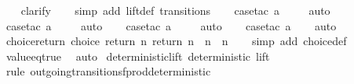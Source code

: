 \begin{isabellebody}
\ \ \isamarkupfalse%
\ clarify\isanewline
\ \ \isamarkupfalse%
\ {\isacharparenleft}simp\ add{\isacharcolon}\ lift{\isacharunderscore}def\ transitions{\isacharparenright}\isanewline
\ \ \isamarkupfalse%
\ {\isacharparenleft}case{\isacharunderscore}tac\ {\isachardoublequoteopen}a{\isacharequal}{}{\isachardoublequoteclose}{\isacharparenright}\isanewline
\ \ \ \isamarkupfalse%
\ auto{\isacharbrackleft}{}{\isacharbrackright}\isanewline
\ \ \isamarkupfalse%
\ {\isacharparenleft}case{\isacharunderscore}tac\ {\isachardoublequoteopen}a{\isacharequal}{}{\isachardoublequoteclose}{\isacharparenright}\isanewline
\ \ \ \isamarkupfalse%
\ auto{\isacharbrackleft}{}{\isacharbrackright}\isanewline
\ \ \isamarkupfalse%
\ {\isacharparenleft}case{\isacharunderscore}tac\ {\isachardoublequoteopen}a{\isacharequal}{}{\isachardoublequoteclose}{\isacharparenright}\isanewline
\ \ \ \isamarkupfalse%
\ auto{\isacharbrackleft}{}{\isacharbrackright}\isanewline
\ \ \isamarkupfalse%
\ {\isacharparenleft}case{\isacharunderscore}tac\ {\isachardoublequoteopen}a{\isacharequal}{}{\isachardoublequoteclose}{\isacharparenright}\isanewline
\ \ \isamarkupfalse%
\ auto%
\endisatagproof
{\isafoldproof}%
%
\isadelimproof
\isanewline
%
\endisadelimproof
\isanewline
{}\isamarkupfalse%
\ choice{\isacharunderscore}return{\isacharcolon}\ {\isachardoublequoteopen}choice\ {\isacharparenleft}return\ n{\isacharparenright}\ {\isacharparenleft}return\ n{\isacharprime}{\isacharparenright}\ {\isasymLongrightarrow}\ n\ {\isacharequal}\ n{\isacharprime}{\isachardoublequoteclose}\isanewline
%
\isadelimproof
\ \ %
\endisadelimproof
%
\isatagproof
{}\isamarkupfalse%
\ {\isacharparenleft}simp\ add{\isacharcolon}\ choice{\isacharunderscore}def{\isacharparenright}\isanewline
\ \ \isamarkupfalse%
\ value{\isacharunderscore}eq{\isacharunderscore}true\ \isamarkupfalse%
\ auto%
\endisatagproof
{\isafoldproof}%
%
\isadelimproof
\isanewline
%
\endisadelimproof
\isanewline
{}\isamarkupfalse%
\ deterministic{\isacharunderscore}lift{\isacharcolon}\ {\isachardoublequoteopen}deterministic\ lift{\isachardoublequoteclose}\isanewline
%
\isadelimproof
\ \ %
\endisadelimproof
%
\isatagproof
{}\isamarkupfalse%
\ {\isacharparenleft}rule\ outgoing{\isacharunderscore}transitions{\isacharunderscore}fprod{\isacharunderscore}deterministic{\isacharparenright}\isanewline

\end{isabellebody}
